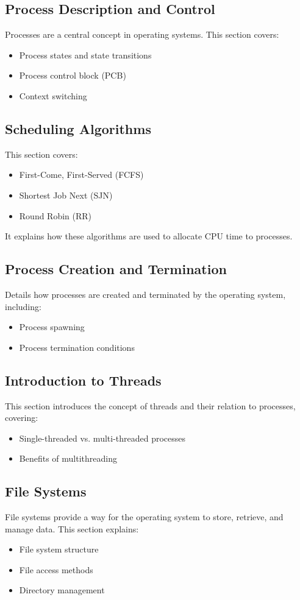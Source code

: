 \documentclass[12pt]{article}
\begin{document}
	
	\subsection{Process Description and Control}
	Processes are a central concept in operating systems. This section covers:
	\begin{itemize}
		\item Process states and state transitions
		\item Process control block (PCB)
		\item Context switching
	\end{itemize}
	
	\subsection{Scheduling Algorithms}
	This section covers:
	\begin{itemize}
		\item First-Come, First-Served (FCFS)
		\item Shortest Job Next (SJN)
		\item Round Robin (RR)
	\end{itemize}
	It explains how these algorithms are used to allocate CPU time to processes.
	
	\subsection{Process Creation and Termination}
	Details how processes are created and terminated by the operating system, including:
	\begin{itemize}
		\item Process spawning
		\item Process termination conditions
	\end{itemize}
	
	\subsection{Introduction to Threads}
	This section introduces the concept of threads and their relation to processes, covering:
	\begin{itemize}
		\item Single-threaded vs. multi-threaded processes
		\item Benefits of multithreading
	\end{itemize}
	
	\subsection{File Systems}
	File systems provide a way for the operating system to store, retrieve, and manage data. This section explains:
	\begin{itemize}
		\item File system structure
		\item File access methods
		\item Directory management
	\end{itemize}
	
\end{document}
